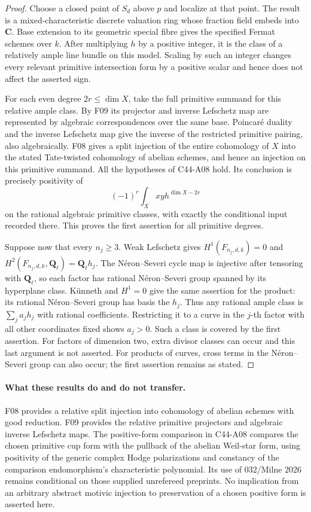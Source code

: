 \documentclass[11pt]{article}
\theoremstyle{remark}\newtheorem{remark}[theorem]{Remark}
\begin{document}
\begin{proof}
Choose a closed point of $S_d$ above $p$ and localize at that
point. The result is a mixed-characteristic discrete valuation
ring whose fraction field embeds into $\mathbf C$. Base
extension to its geometric special fibre gives the specified
Fermat schemes over $k$. After multiplying $h$ by a positive
integer, it is the class of a relatively ample line bundle on
this model. Scaling by such an integer changes every relevant
primitive intersection form by a positive scalar and hence
does not affect the asserted sign.

For each even degree $2r\leq\dim X$, take the full primitive
summand for this relative ample class. By F09 its projector
and inverse Lefschetz map are represented by algebraic
correspondences over the same base. Poincar\'e duality and
the inverse Lefschetz map give the inverse of the restricted
primitive pairing, also algebraically. F08 gives a split
injection of the entire cohomology of $X$ into the stated
Tate-twisted cohomology of abelian schemes, and hence an
injection on this primitive summand. All the hypotheses of
C44-A08 hold. Its conclusion is precisely positivity of
\[
 (-1)^r\int_X xyh^{\dim X-2r}
\]
on the rational algebraic primitive classes, with exactly the
conditional input recorded there. This proves the first
assertion for all primitive degrees.

Suppose now that every $n_j\geq3$. Weak Lefschetz gives
$H^1(F_{n_j,d,k})=0$ and
$H^2(F_{n_j,d,k},\mathbf Q_\ell)=\mathbf Q_\ell h_j$.
The N\'eron--Severi cycle map is injective after tensoring
with $\mathbf Q_\ell$, so each factor has rational
N\'eron--Severi group spanned by its hyperplane class.
K\"unneth and $H^1=0$ give the same assertion for the product:
its rational N\'eron--Severi group has basis the $h_j$.
Thus any rational ample class is $\sum_j a_jh_j$ with
rational coefficients. Restricting it to a curve in the
$j$-th factor with all other coordinates fixed shows
$a_j>0$. Such a class is covered by the first assertion.
For factors of dimension two, extra divisor classes can
occur and this last argument is not asserted. For products
of curves, cross terms in the N\'eron--Severi group can also
occur; the first assertion remains as stated.
\end{proof}

\paragraph{What these results do and do not transfer.}
F08 provides a relative split injection into cohomology of
abelian schemes with good reduction. F09 provides the relative
primitive projectors and algebraic inverse Lefschetz maps.
The positive-form comparison in C44-A08 compares the
chosen primitive cup form with the pullback of the abelian
Weil-star form, using positivity of the generic complex Hodge
polarizations and constancy of the comparison endomorphism's
characteristic polynomial. Its use of 032/Milne 2026 remains conditional
on those supplied unrefereed preprints. No implication from an
arbitrary abstract motivic injection to preservation of a
chosen positive form is asserted here.
\end{document}
